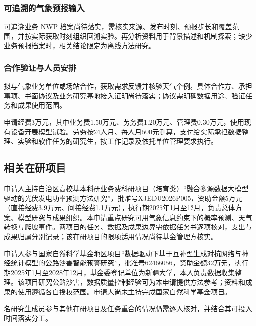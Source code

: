 \subsubsection{可追溯的气象预报输入}
可追溯业务 NWP 档案尚待落实，需核实来源、发布时刻、预报步长和覆盖范围，并按实际获取时刻组织回溯实验。再分析资料用于背景描述和机制探索；缺少业务预报档案时，相关结论限定为离线方法研究。

\subsubsection{合作验证与人员安排}
拟与气象业务单位或场站合作，获取需求反馈并核验天气个例。具体合作方、承担事项、书面协议及业务研究基地接入证明尚待落实；协议需明确数据用途、验证任务和成果使用范围。

申请经费3万元，其中业务费1.50万元、劳务费1.20万元、管理费0.30万元，使用现有设备开展模型试验。劳务按24人月、每人月500元测算，支付给实际承担数据整理、实验和软件任务的研究生，按工作记录及依托单位管理要求执行。

\subsection{相关在研项目}
申请人主持自治区高校基本科研业务费科研项目（培育类）“融合多源数据大模型驱动的光伏发电功率预测方法研究”，批准号XJEDU2026P005，资助金额5万元（直接经费3.9万元、间接经费1.1万元），执行期2026年1月至12月，负责总体方案、模型研究与成果组织。本申请重点研究可用气象信息约束下的概率预测、天气转换与爬坡事件。两项目的任务、数据及成果边界需依据任务书逐项核对，支出与成果归属分别记录；该在研项目的限项适用情况尚待基金管理方核实。

申请人参与国家自然科学基金地区项目“数据驱动下基于互补型生成对抗网络与神经统计模型的公路沙害智能预警研究”，批准号62466056，资助金额32万元，执行期2025年1月至2028年12月，基金委登记单位为新疆大学，本人负责数据收集整理。该项目研究公路沙害，数据质量控制经验可为本申请提供方法参考；资料和成果的使用遵循各自授权范围。申请人尚未主持完成国家自然科学基金项目。

名研究生成员参与其他在研项目及任务重合的情况仍需逐人核对，并结合其可投入时间落实分工。


